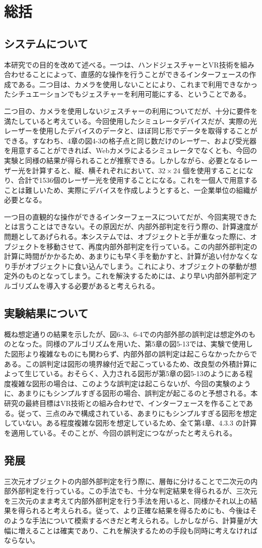 \section{総括}

\subsection{システムについて}
本研究での目的を改めて述べる。一つは、ハンドジェスチャーとVR技術を組み合わせることによって、直感的な操作を行うことができるインターフェースの作成である。二つ目は、カメラを使用しないことにより、これまで利用できなかったシチュエーションでもジェスチャーを利用可能にする、ということである。

二つ目の、カメラを使用しないジェスチャーの利用についてだが、十分に要件を満たしていると考えている。今回使用したシミュレータデバイスだが、実際の光レーザーを使用したデバイスのデータと、ほぼ同じ形でデータを取得することができる。すなわち、4章の図4-3の格子点と同じ数だけのレーザー、および受光器を用意することができれば、Webカメラによるシミュレータでなくとも、今回の実験と同様の結果が得られることが推察できる。しかしながら、必要となるレーザー光を計算すると、縦、横それぞれにおいて、$32 \times 24$ 個を使用することになり、合計で1536個のレーザー光を使用することになる。これを一個人で用意することは難しいため、実際にデバイスを作成しようとすると、一企業単位の組織が必要となる。

一つ目の直観的な操作ができるインターフェースについてだが、今回実現できたとは言うことはできない。その原因だが、内部外部判定を行う際の、計算速度が問題としてあげられる。本システムでは、オブジェクトと手が重なった際に、オブジェクトを移動させて、再度内部外部判定を行っている。この内部外部判定の計算に時間がかかるため、あまりにも早く手を動かすと、計算が追い付かなくなり手がオブジェクトに食い込んでしまう。これにより、オブジェクトの挙動が想定外のものとなってしまう。これを解決するためには、より早い内部外部判定アルゴリズムを導入する必要があると考えられる。

\subsection{実験結果について}
概ね想定通りの結果を示したが、図6-3、6-4での内部外部の誤判定は想定外のものとなった。同様のアルゴリズムを用いた、第5章の図5-13では、実験で使用した図形より複雑なものにも関わらず、内部外部の誤判定は起こらなかったからである。この誤判定は図形の境界線付近で起こっているため、改良型の外積計算によって生じている。おそらく、入力される図形が第5章の図5-13のようにある程度複雑な図形の場合は、このような誤判定は起こらないが、今回の実験のように、あまりにもシンプルすぎる図形の場合、誤判定が起こるのと予想される。本研究の最終目標はVR技術との組み合わせで、インターフェースを作ることである。従って、三点のみで構成されている、あまりにもシンプルすぎる図形を想定していない。ある程度複雑な図形を想定しているため、全て第4章、4.3.3 の計算を適用している。そのことが、今回の誤判定につながったと考えられる。


\subsection{発展}
三次元オブジェクトの内部外部判定を行う際に、層毎に分けることで二次元の内部外部判定を行っている。この手法でも、十分な判定結果を得られるが、三次元を三次元のまま考えて内部外部判定を行う手法を用いると、同様かそれ以上の結果を得られると考えられる。従って、より正確な結果を得るためにも、今後はそのような手法について模索するべきだと考えられる。しかしながら、計算量が大幅に増えることは確実であり、これを解決するための手段も同時に考えなければならない。
